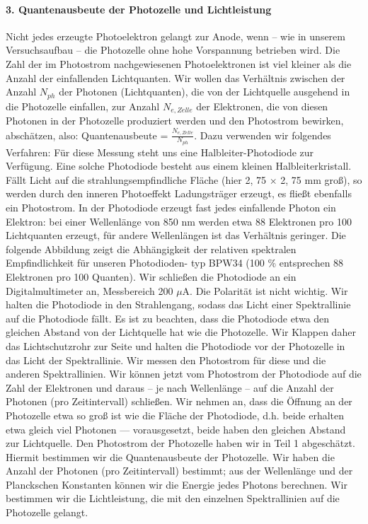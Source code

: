 \documentclass[12pt]{scrartcl}
\begin{document}
\paragraph{3. Quantenausbeute der Photozelle und Lichtleistung}
Nicht jedes erzeugte Photoelektron gelangt zur Anode, wenn -- wie in unserem Versuchsaufbau -- die
Photozelle ohne hohe Vorspannung betrieben wird. Die Zahl der im Photostrom nachgewiesenen Photoelektronen ist viel kleiner als die Anzahl der einfallenden Lichtquanten. %
Wir wollen das Verhältnis zwischen der Anzahl $N_{ph}$ der Photonen (Lichtquanten), die von der Lichtquelle ausgehend in die Photozelle einfallen, zur
Anzahl $N_{e,Zelle}$ der Elektronen, die von diesen Photonen in der Photozelle produziert werden und den Photostrom bewirken, abschätzen, also: Quantenausbeute = $\frac{N_{e,Zelle}} {N_{ph}}$.
Dazu verwenden wir folgendes Verfahren: Für diese Messung steht uns eine Halbleiter-Photodiode zur Verfügung. Eine solche Photodiode besteht aus einem kleinen Halbleiterkristall. Fällt Licht auf die strahlungsempfindliche Fläche (hier 2, 75 $\times$ 2, 75 mm groß), so werden durch den inneren Photoeffekt Ladungsträger erzeugt, es fließt ebenfalls ein Photostrom. In der Photodiode erzeugt fast jedes einfallende Photon ein Elektron: bei einer Wellenlänge von 850 nm werden
etwa 88 Elektronen pro 100 Lichtquanten erzeugt, für andere Wellenlängen ist das Verhältnis geringer.
Die folgende Abbildung zeigt die Abhängigkeit der relativen spektralen Empfindlichkeit für unseren Photodioden-
typ BPW34 (100 \% entsprechen 88 Elektronen pro 100 Quanten).
Wir schließen die Photodiode an ein Digitalmultimeter an, Messbereich 200 $\mu$A. Die Polarität ist nicht wichtig. Wir halten die Photodiode in den Strahlengang, sodass das Licht einer Spektrallinie auf die Photodiode fällt. Es ist zu beachten, dass die Photodiode etwa den gleichen Abstand von der Lichtquelle hat wie die Photozelle.
Wir Klappen daher das Lichtschutzrohr zur Seite
und halten die Photodiode vor der Photozelle in das Licht der Spektrallinie.
Wir messen den Photostrom für diese und die anderen Spektrallinien.
Wir können jetzt vom Photostrom der Photodiode auf die Zahl der Elektronen und daraus -- je nach Wellenlänge -- auf die Anzahl der Photonen (pro Zeitintervall) schließen. Wir nehmen an, dass die Öffnung an der Photozelle etwa so groß ist wie die Fläche der Photodiode, d.h. beide erhalten etwa gleich viel Photonen — vorausgesetzt, beide haben den gleichen Abstand zur Lichtquelle. Den Photostrom der Photozelle haben wir in Teil 1 abgeschätzt. Hiermit bestimmen wir die Quantenausbeute der Photozelle. Wir haben die Anzahl der Photonen (pro Zeitintervall) bestimmt; aus der Wellenlänge und der Planckschen Konstanten können wir die Energie jedes Photons berechnen. Wir bestimmen wir die Lichtleistung, die mit den einzelnen Spektrallinien auf die Photozelle gelangt.
\end{document}
